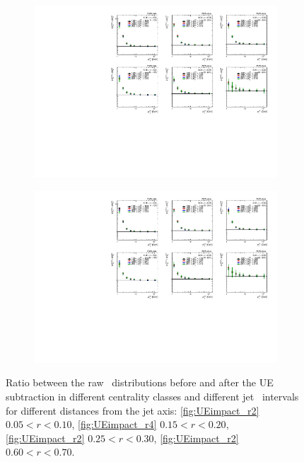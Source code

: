 \begin{figure}
\begin{subfigure}{0.5\textwidth}
\centering \includegraphics[page=6,width=1\textwidth]{figures/main/UE/ChPS_B2S_PbPb_data.pdf}
\caption{}
\label{fig:UEimpact_r6}
\end{subfigure}
\begin{subfigure}{0.5\textwidth}
\centering \includegraphics[page=10,width=1\textwidth]{figures/main/UE/ChPS_B2S_PbPb_data.pdf}
\caption{}
\label{fig:UEimpact_r10}
\end{subfigure}
\caption{Ratio between the raw \Dptr\ distributions before and after the UE  subtraction in different centrality classes and different jet \pT\ intervals for different distances from the jet axis: \ref{fig:UEimpact_r2}  $0.05 < r < 0.10$, \ref{fig:UEimpact_r4}  $0.15 < r < 0.20$, \ref{fig:UEimpact_r2}  $0.25 < r < 0.30$, \ref{fig:UEimpact_r2}  $0.60 < r < 0.70$.}
\label{fig:UEimpact}
\end{figure}


